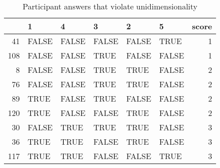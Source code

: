 \begin{table}[ht]
\centering
\begin{tabular}{rlllllr}
  \toprule
 & 1 & 4 & 3 & 2 & 5 & score \\ 
  \midrule
41 & FALSE & FALSE & FALSE & FALSE & TRUE & 1 \\ 
  108 & FALSE & FALSE & TRUE & FALSE & FALSE & 1 \\ 
  8 & FALSE & FALSE & TRUE & TRUE & FALSE & 2 \\ 
  76 & FALSE & FALSE & TRUE & TRUE & FALSE & 2 \\ 
  89 & TRUE & FALSE & TRUE & FALSE & FALSE & 2 \\ 
  120 & TRUE & FALSE & FALSE & TRUE & FALSE & 2 \\ 
  30 & FALSE & TRUE & TRUE & TRUE & FALSE & 3 \\ 
  36 & TRUE & TRUE & FALSE & TRUE & FALSE & 3 \\ 
  117 & TRUE & TRUE & FALSE & FALSE & TRUE & 3 \\ 
   \bottomrule
\end{tabular}
\caption{Participant answers that violate unidimensionality} 
\label{tab:viol}
\end{table}
